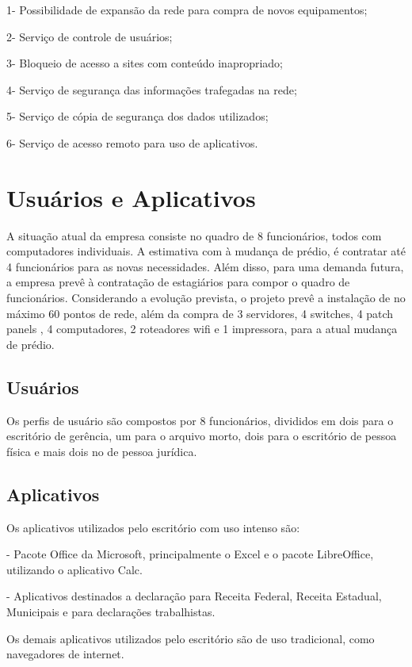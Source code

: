 \documentclass[	DIV=calc,%
							paper=a4,%
							fontsize=12pt,%
							onecolumn]{scrartcl}	 					%
\begin{document}
1- Possibilidade de expansão da rede para compra de novos equipamentos;

2- Serviço de controle de usuários;

3- Bloqueio de acesso a sites com conteúdo inapropriado;

4- Serviço de segurança das informações trafegadas na rede;

5- Serviço de cópia de segurança dos dados utilizados;

6- Serviço de acesso remoto para uso de aplicativos.

\section{Usuários e Aplicativos}
A situação atual da empresa consiste no quadro de 8 funcionários, todos com computadores individuais. A estimativa com à mudança de prédio, é contratar até 4 funcionários para as novas necessidades. Além disso, para uma demanda futura, a empresa prevê à contratação de estagiários para compor o quadro de funcionários. Considerando a evolução prevista, o projeto prevê a instalação de no máximo 60 pontos de rede, além da compra de 3 servidores, 4 switches, 4 patch panels , 4 computadores, 2 roteadores wifi e 1 impressora, para a atual mudança de prédio.

\subsection{Usuários}
Os perfis de usuário são compostos por 8 funcionários, divididos em dois para o escritório de gerência, um para o arquivo morto, dois para o escritório de pessoa física e mais dois no de pessoa jurídica.

\subsection{Aplicativos}
Os aplicativos utilizados pelo escritório com uso intenso são:

- Pacote Office da Microsoft, principalmente o Excel e o pacote LibreOffice, utilizando o aplicativo Calc.

- Aplicativos destinados a declaração para Receita Federal, Receita Estadual, Municipais e para declarações trabalhistas.

Os demais aplicativos utilizados pelo escritório são de uso tradicional, como navegadores de internet.
\end{document}
